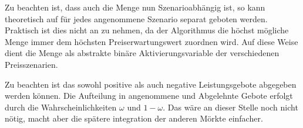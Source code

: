 Zu beachten ist, dass auch die Menge nun Szenarioabhängig ist, so kann theoretisch auf für jedes angenommene Szenario separat geboten werden. Praktisch ist dies nicht an zu nehmen, da der Algorithmus die höchst mögliche Menge immer dem höchsten Preiserwartungswert  zuordnen wird. Auf diese Weise dient die Menge als abstrakte binäre Aktivierungsvariable der verschiedenen Preisszenarien.

Zu beachten ist das sowohl positive als auch negative Leistungsgebote abgegeben werden können. Die Aufteilung in angenommene und Abgelehnte
Gebote erfolgt durch die Wahrscheinlichkeiten $\omega$ und $1-\omega$. Das wäre an dieser Stelle noch nicht nötig, macht aber
die spätere integration der anderen Mörkte einfacher.\\

